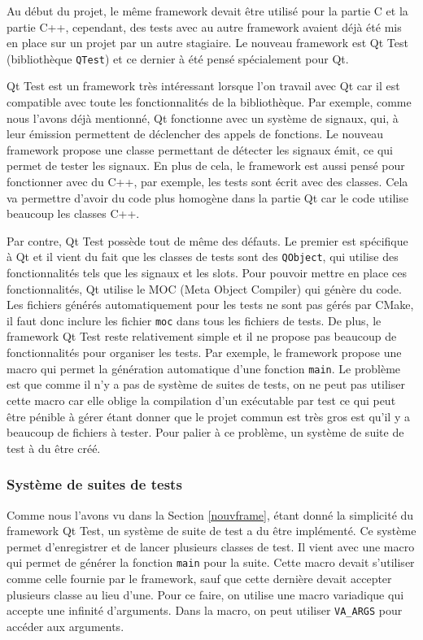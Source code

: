 \documentclass[a4paper]{article}
\begin{document}
Au début du projet, le même framework devait être utilisé pour la partie C et la
partie C++, cependant, des tests avec au autre framework avaient déjà été mis en
place sur un projet par un autre stagiaire. Le nouveau framework est Qt Test
(bibliothèque \verb|QTest|) et ce dernier à été pensé spécialement pour Qt.

Qt Test est un framework très intéressant lorsque l'on travail avec Qt car il
est compatible avec toute les fonctionnalités de la bibliothèque. Par exemple,
comme nous l'avons déjà mentionné, Qt fonctionne avec un système de signaux,
qui, à leur émission permettent de déclencher des appels de fonctions. Le
nouveau framework propose une classe permettant de détecter les signaux émit, ce
qui permet de tester les signaux. En plus de cela, le framework est aussi pensé
pour fonctionner avec du C++, par exemple, les tests sont écrit avec des
classes. Cela va permettre d'avoir du code plus homogène dans la partie Qt car
le code utilise beaucoup les classes C++.

Par contre, Qt Test possède tout de même des défauts. Le premier est spécifique
à Qt et il vient du fait que les classes de tests sont des \verb|QObject|, qui
utilise des fonctionnalités tels que les signaux et les \gls{slots}. Pour
pouvoir mettre en place ces fonctionnalités, Qt utilise le MOC (Meta Object
Compiler) qui génère du code. Les fichiers générés automatiquement pour les
tests ne sont pas gérés par CMake, il faut donc inclure les fichier \verb|moc|
dans tous les fichiers de tests. De plus, le framework Qt Test reste
relativement simple et il ne propose pas beaucoup de fonctionnalités pour
organiser les tests. Par exemple, le framework propose une macro qui permet la
génération automatique d'une fonction \verb|main|. Le problème est que comme il
n'y a pas de système de suites de tests, on ne peut pas utiliser cette macro car
elle oblige la compilation d'un exécutable par test ce qui peut être pénible à
gérer étant donner que le projet commun est très gros est qu'il y a beaucoup de
fichiers à tester. Pour palier à ce problème, un système de suite de test à du
être créé.

\subsubsection*{Système de suites de tests}

Comme nous l'avons vu dans la Section \ref{nouvframe}, étant donné la simplicité
du framework Qt Test, un système de suite de test a du être implémenté. Ce
système permet d'enregistrer et de lancer plusieurs classes de test. Il vient
avec une macro qui permet de générer la fonction \verb|main| pour la suite.
Cette macro devait s'utiliser comme celle fournie par le framework, sauf que
cette dernière devait accepter plusieurs classe au lieu d'une. Pour ce faire, on
utilise une macro variadique qui accepte une infinité d'arguments. Dans la
macro, on peut utiliser \verb|VA_ARGS| pour accéder aux arguments.
\end{document}
